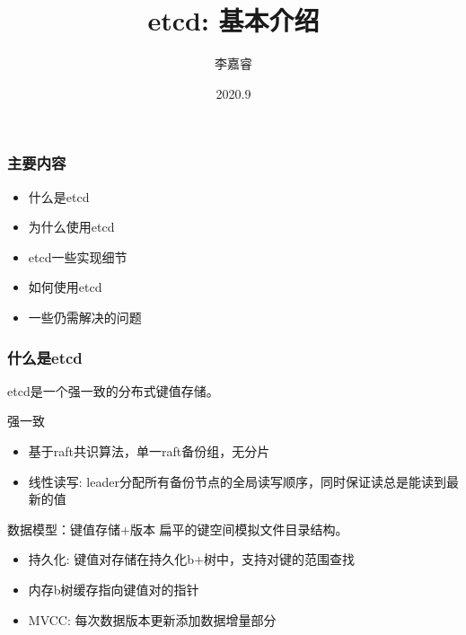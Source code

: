 \documentclass{beamer}
\title{etcd: 基本介绍}
\author{李嘉睿}
\institute[]{中间件团队}
\date{2020.9}
\begin{document}
\frame{\titlepage}

\begin{frame}
\frametitle{主要内容}
\tableofcontents
\begin{itemize}
    \item 什么是etcd
    \item 为什么使用etcd
    \item etcd一些实现细节
    \item 如何使用etcd
    \item 一些仍需解决的问题
\end{itemize}
\end{frame}

\begin{frame}
\frametitle{什么是etcd}
etcd是一个\alert{强一致}的分布式\alert{键值存储}。

\begin{block}{强一致}
\begin{itemize}
    \item 基于raft共识算法，单一raft备份组，无分片
    \item \alert{线性读写:} leader分配所有备份节点的全局读写顺序，同时保证读总是能读到最新的值
\end{itemize}
\end{block}

\begin{block}{数据模型：键值存储+版本}
扁平的键空间模拟文件目录结构。
\begin{itemize}
    \item \alert{持久化:} 键值对存储在持久化b+树中，支持对键的范围查找
    \item 内存b树缓存指向键值对的指针
    \item \alert{MVCC:} 每次数据版本更新添加数据增量部分
\end{itemize}
\end{block}
\end{frame}
\end{document}

